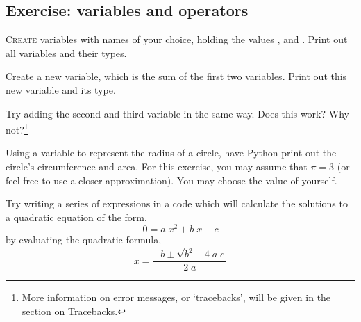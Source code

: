 \subsection{Exercise: variables and operators}

\lettrine{C}{reate} variables with names of your choice, holding the values ,  and . Print out all variables and their types. 

Create a new variable, which is the sum of the first two variables. Print out this new variable and its type.

Try adding the second and third variable in the same way. Does this work? Why not?\footnote{More information on error messages, or `tracebacks', will be given in the section on Tracebacks.}

Using a variable  to represent the radius of a circle, have Python print out the circle's circumference and area. For this exercise, you may assume that $\pi = 3$ (or feel free to use a closer approximation). You may choose the value of  yourself.

\begin{hightask}[Task]
	Try writing a series of expressions in a code which will calculate the solutions to a quadratic equation of the form,
	\begin{equation}
	0 = a\; x^2 + b\; x + c
	\end{equation}
	by evaluating the quadratic formula,
	\begin{equation}
	x = \frac{- b \pm \sqrt{b^2 - 4\; a\; c}}{2 \; a}
	\end{equation}
\end{hightask}


